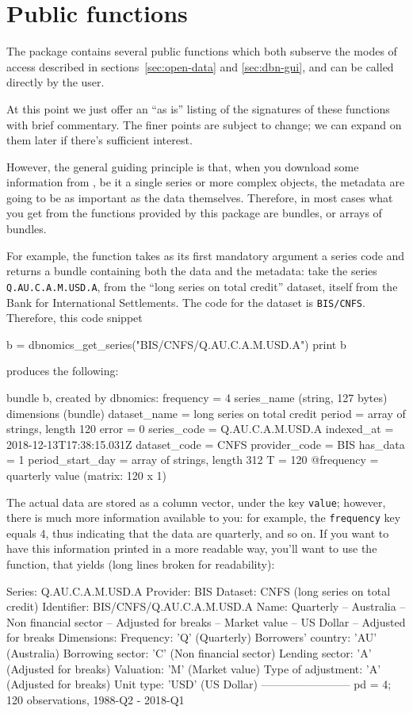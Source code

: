 \documentclass{article}
\begin{document}
\section{Public functions}
\label{sec:dbn-funcs}

The package contains several public functions which both subserve the
modes of access described in sections~\ref{sec:open-data} and
\ref{sec:dbn-gui}, and can be called directly by the user.

At this point we just offer an ``as is'' listing of the signatures of
these functions with brief commentary. The finer points are subject to
change; we can expand on them later if there's sufficient
interest.

However, the general guiding principle is that, when you download some
information from \DB, be it a single series or more
complex objects, the metadata are going to be as important as the data
themselves. Therefore, in most cases what you get from the functions
provided by this package are bundles, or arrays of bundles.

For example, the  function takes as its first
mandatory argument a series code and returns a bundle containing both
the data and the metadata: take the series \texttt{Q.AU.C.A.M.USD.A},
from the ``long series on total credit'' dataset, itself from the Bank
for International Settlements. The code for the dataset is
\texttt{BIS/CNFS}. Therefore, this code snippet
\begin{code}
  b = dbnomics_get_series("BIS/CNFS/Q.AU.C.A.M.USD.A")
  print b
\end{code}
produces the following:
\begin{code}
bundle b, created by dbnomics:
  frequency = 4
  series_name (string, 127 bytes)
  dimensions (bundle)
  dataset_name = long series on total credit
  period = array of strings, length 120
  error = 0
  series_code = Q.AU.C.A.M.USD.A
  indexed_at = 2018-12-13T17:38:15.031Z
  dataset_code = CNFS
  provider_code = BIS
  has_data = 1
  period_start_day = array of strings, length 312
  T = 120
  @frequency = quarterly
  value (matrix: 120 x 1)
\end{code}
The actual data are stored as a column vector, under the key
\texttt{value}; however, there is much more information available to
you: for example, the \texttt{frequency} key equals 4, thus indicating
that the data are quarterly, and so on. If you want to have this
information printed in a more readable way, you'll want to use the
 function, that yields (long lines broken for
readability):
\begin{code}
Series: Q.AU.C.A.M.USD.A
Provider: BIS
Dataset: CNFS (long series on total credit)
Identifier: BIS/CNFS/Q.AU.C.A.M.USD.A
Name: Quarterly – Australia – Non financial sector – Adjusted for
  breaks – Market value – US Dollar – Adjusted for breaks
Dimensions:
  Frequency: 'Q' (Quarterly)
  Borrowers' country: 'AU' (Australia)
  Borrowing sector: 'C' (Non financial sector)
  Lending sector: 'A' (Adjusted for breaks)
  Valuation: 'M' (Market value)
  Type of adjustment: 'A' (Adjusted for breaks)
  Unit type: 'USD' (US Dollar)
------------------------
pd = 4; 120 observations, 1988-Q2 - 2018-Q1
\end{code}
\end{document}
